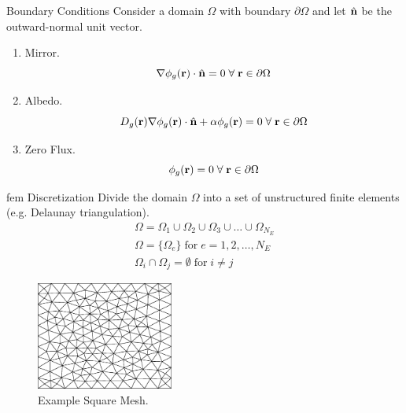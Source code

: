 \begin{frame}{Boundary Conditions}
  Consider a domain $\Omega$ with boundary $\partial \Omega$ and let $\hat{\mathbf{n}}$ be
  the outward-normal unit vector.
  \begin{enumerate}
    \item Mirror.
      \begin{equation}
        \mathbf{\nabla} \phi_g(\mathbf{r}) \cdot \hat{\mathbf{n}} = 0 \; \forall \; \mathbf{r} \in \partial \Omega
      \end{equation}
    \item Albedo. 
      \begin{equation}
        D_g(\mathbf{r}) \mathbf{\nabla} \phi_g(\mathbf{r}) \cdot \hat{\mathbf{n}} + \alpha \phi_g(\mathbf{r})
          = 0 \; \forall \; \mathbf{r} \in \partial \Omega
      \end{equation}
    \item Zero Flux. 
      \begin{equation}
        \phi_g(\mathbf{r}) = 0 \; \forall \; \mathbf{r} \in \partial \Omega
      \end{equation}
  \end{enumerate}
\end{frame}

\begin{frame}{\gls{fem} Discretization}
  Divide the domain $\Omega$ into a set of unstructured finite elements 
  (e.g. Delaunay triangulation).
  \begin{gather}
    \label{eq:set_of_elements}
    \Omega = \Omega_1 \cup \Omega_2 \cup \Omega_3 \cup \ldots \cup
      \Omega_{N_E}  \\
    \Omega = \{\Omega_e\} \; \text{for} \; e = 1,2,\ldots,N_E \\
    \Omega_i \cap \Omega_j = \emptyset \; \text{for} \; i \ne j
  \end{gather}
  \begin{figure}
    \centering
    \includegraphics[width=0.4\textwidth]{./figs/fixed0}
    \caption{Example Square Mesh.}
    \label{fig:fixed0}
  \end{figure}
\end{frame}

